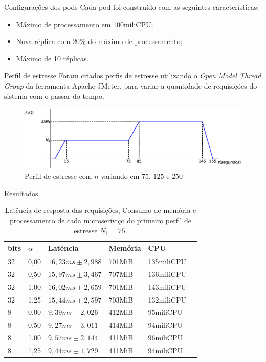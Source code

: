 \begin{frame}{Configurações dos pods}
    Cada pod foi construído com as seguintes características:
    \begin{itemize}
        \item Máximo de processamento em 100miliCPU;
        \item Nova réplica com 20\% do máximo de processamento;
        \item Máximo de 10 réplicas.
    \end{itemize}
\end{frame}

\begin{frame}{Perfil de estresse}
    Foram criados perfis de estresse utilizando o \textit{Open Model Thread Group} da ferramenta Apache JMeter, para variar a quantidade de requisições do sistema com o passar do tempo.
    \begin{figure}[H]
    \centering
    \includegraphics[width=1\textwidth]{figuras/estresse.eps}
    \caption{Perfil de estresse com $n$ variando em $75$, $125$ e $250$}
    \end{figure}
\end{frame}

\begin{frame}{Resultados}
    \scriptsize
    \begin{table}[H]
        \caption{\scriptsize{Latência de resposta das requisições, Consumo de memória e processamento de cada microseriviço do primeiro perfil de estresse $N_1 = 75$.}}
        \centering
        \begin{tabular}{llllll} \\
        \hline
        \textbf{bits} & \textbf{$\alpha$}  &  \textbf{Latência} & \textbf{Memória} &\textbf{CPU}\\  \hline
        32 &0,00& $16,23ms \pm 2,988$ & 701MiB & 135miliCPU\\
        32 &0,50& $15,97ms \pm 3,467$ & 707MiB & 136miliCPU\\
        32 &1,00& $16,02ms \pm 2,659$ & 701MiB & 143miliCPU\\
        32 &1,25& $15,44ms \pm 2,597$ & 703MiB & 132miliCPU\\
        8  &0,00& $9,39ms \pm 2,026$ & 412MiB & 95miliCPU\\
        8  &0,50& $9,27ms \pm 3,011$ & 414MiB & 94miliCPU\\
        8  &1,00& $9,57ms \pm 2,144$ & 411MiB & 96miliCPU\\
        8  &1,25& $9,44ms \pm 1,729$ & 411MiB & 94miliCPU\\
        \hline
        \end{tabular}
        \end{table}
\end{frame}

